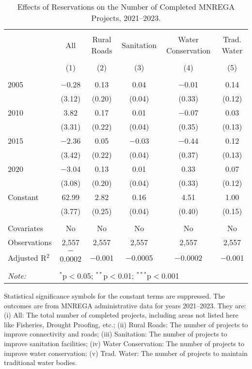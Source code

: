\begin{table}[!htbp]
\centering
\begin{threeparttable}

  \caption{Effects of Reservations on the Number of Completed MNREGA Projects, 2021--2023.} 
  \label{main_mnrega_2011_2023_additive} 
\scriptsize 
\begin{tabular}{@{\extracolsep{0pt}}lccccc} 
\\[-1.8ex]\hline 
\hline \\[-1.8ex] 
 & All & Rural Roads & Sanitation & Water Conservation & Trad. Water \\ 
\\[-1.8ex] & (1) & (2) & (3) & (4) & (5)\\ 
\hline \\[-1.8ex] 
 2005 & $-$0.28 & 0.13 & 0.04 & $-$0.01 & 0.14 \\ 
  & (3.12) & (0.20) & (0.04) & (0.33) & (0.12) \\ 
  2010 & 3.82 & 0.17 & 0.01 & $-$0.07 & 0.03 \\ 
  & (3.31) & (0.22) & (0.04) & (0.35) & (0.13) \\ 
  2015 & $-$2.36 & 0.05 & $-$0.03 & $-$0.44 & 0.12 \\ 
  & (3.42) & (0.22) & (0.04) & (0.37) & (0.13) \\ 
  2020 & $-$3.04 & 0.13 & 0.01 & 0.33 & 0.07 \\ 
  & (3.08) & (0.20) & (0.04) & (0.33) & (0.12) \\ 
  Constant & 62.99 & 2.82 & 0.16 & 4.51 & 1.00 \\ 
  & (3.77) & (0.25) & (0.04) & (0.40) & (0.15) \\ 
 \hline \\[-1.8ex] 
Covariates & No & No & No & No & No \\ 
Observations & 2,557 & 2,557 & 2,557 & 2,557 & 2,557 \\ 
Adjusted R$^{2}$ & $-$0.0002 & $-$0.001 & $-$0.0005 & $-$0.0002 & $-$0.001 \\ 
\hline 
\hline \\[-1.8ex] 
\textit{Note:}  & \multicolumn{5}{l}{$^{*}$p$<$0.05; $^{**}$p$<$0.01; $^{***}$p$<$0.001} \\ 
\end{tabular} 
\begin{tablenotes}[flushleft]
\scriptsize
\item[] Statistical significance symbols for the constant terms are suppressed. The outcomes are from MNREGA administrative data for years 2021--2023. They are: 
(i) All: The total number of completed projects, including areas not listed here like Fisheries, Drought Proofing, etc.;
(ii) Rural Roads: The number of projects to improve connectivity and roads;
(iii) Sanitation: The number of projects to improve sanitation facilities;
(iv) Water Conservation: The number of projects to improve water conservation;
(v) Trad. Water: The number of projects to maintain traditional water bodies.
\end{tablenotes}
\end{threeparttable}
\end{table}
